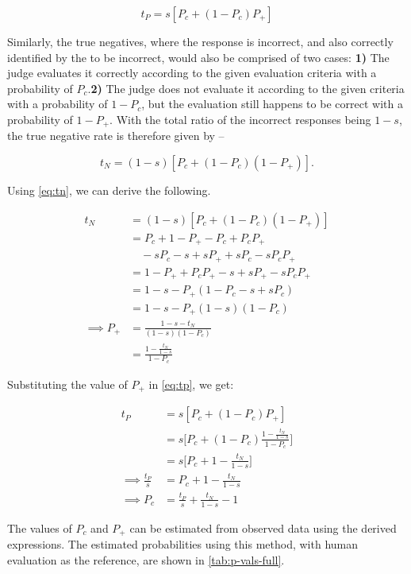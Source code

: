 \begin{equation}\label{eq:tp}
    t_P = s[P_c + (1-P_c)P_+]
\end{equation}

Similarly, the true negatives, where the \evaluatormodel response is incorrect, and also correctly identified by the \judgemodel to be incorrect, would also be comprised of two cases: \textbf{1)} The judge evaluates it correctly according to the given evaluation criteria with a probability of $P_c$.\textbf{2)} The judge does not evaluate it according to the given criteria with a probability of $1-P_c$, but the evaluation still happens to be correct with a probability of $1-P_+$. With the total ratio of the incorrect responses being $1-s$, the true negative rate is therefore given by --

\begin{equation}\label{eq:tn}
    t_N = (1-s)[P_c + (1-P_c)(1-P_+)].
\end{equation}

Using \cref{eq:tn}, we can derive the following. 

\begin{align}
    t_N &= (1-s)[P_c + (1-P_c)(1-P_+)] \\
    &= P_c + 1 - P_+ - P_c + P_cP_+ \\
    &\quad - sP_c  -s + sP_+ + sP_c - sP_cP_+ \\
    &=  1 - P_+ + P_cP_+ -s + sP_+  - sP_cP_+ \\
    &= 1 - s - P_+(1 - P_c - s + sP_c) \\
    &= 1 - s - P_+(1-s)(1-P_c) \\
    \implies P_+ &=\frac{1-s - t_N}{(1-s)(1-P_c)} \\
    &= \frac{1 - \frac{t_N}{1-s}}{1-P_c}
\end{align}

Substituting the value of $P_+$ in \cref{eq:tp}, we get:

\begin{align}
    t_P &= s[P_c + (1-P_c)P_+] \\
    &= s\Bigg[P_c + (1-P_c)\frac{1 - \frac{t_N}{1-s}}{1-P_c}\Bigg] \\
    &= s\bigg[P_c + 1 - \frac{t_N}{1-s}\bigg] \\
    \implies \frac{t_P}{s} &= P_c + 1 - \frac{t_N}{1-s} \\
    \implies P_c &= \frac{t_P}{s} + \frac{t_N}{1-s} - 1
\end{align}

The values of $P_c$ and $P_+$ can be estimated from observed data using the derived expressions. 
The estimated probabilities using this method, with human evaluation as the reference, are shown in \cref{tab:p-vals-full}.

